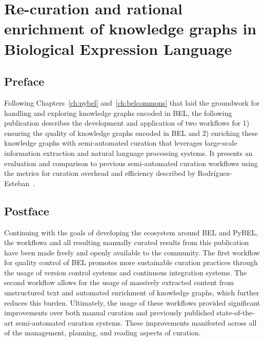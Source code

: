 \chapter{Re-curation and rational enrichment of knowledge graphs in Biological Expression Language}
\label{ch:recuration}

\section*{Preface}

Following Chapters~\ref{ch:pybel} and~\ref{ch:belcommons} that laid the groundwork for handling and exploring knowledge graphs encoded in \ac{BEL}, the following publication describes the development and application of two workflows for 1) ensuring the quality of knowledge graphs encoded in \ac{BEL} and 2) enriching these knowledge graphs with semi-automated curation that leverages large-scale information extraction and natural language processing systems.
It presents an evaluation and comparison to previous semi-automated curation workflows using the metrics for curation overhead and efficiency described by Rodr\'{i}guez-Esteban~\cite{Rodriguez-Esteban2015}.

\vspace*{\fill}



\section*{Postface}

Continuing with the goals of developing the ecosystem around \ac{BEL} and PyBEL, the workflows and all resulting manually curated results from this publication have been made freely and openly available to the community.
The first workflow for quality control of \ac{BEL} promotes more sustainable curation practices through the usage of version control systems and continuous integration systems.
The second workflow allows for the usage of massively extracted content from unstructured text and automated enrichment of knowledge graphs, which further reduces this burden.
Ultimately, the usage of these workflows provided significant improvements over both manual curation and previously published state-of-the-art semi-automated curation systems.
These improvements manifested across all of the management, planning, and reading aspects of curation.
